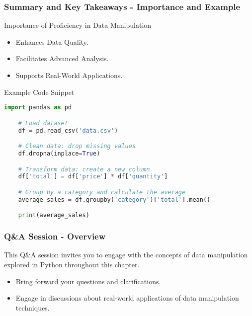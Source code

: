 \documentclass[aspectratio=169]{beamer}
\begin{document}
\begin{frame}[fragile]
    \frametitle{Summary and Key Takeaways - Importance and Example}
    \begin{block}{Importance of Proficiency in Data Manipulation}
        \begin{itemize}
            \item Enhances Data Quality.
            \item Facilitates Advanced Analysis.
            \item Supports Real-World Applications.
        \end{itemize}
    \end{block}

    \begin{block}{Example Code Snippet}
    \begin{lstlisting}[language=Python]
    import pandas as pd

    # Load dataset
    df = pd.read_csv('data.csv')

    # Clean data: drop missing values
    df.dropna(inplace=True)

    # Transform data: create a new column
    df['total'] = df['price'] * df['quantity']

    # Group by a category and calculate the average
    average_sales = df.groupby('category')['total'].mean()

    print(average_sales)
    \end{lstlisting}
    \end{block}
\end{frame}

\begin{frame}[fragile]
  \frametitle{Q\&A Session - Overview}
  This Q\&A session invites you to engage with the concepts of data manipulation explored in Python throughout this chapter. 
  \begin{itemize}
      \item Bring forward your questions and clarifications.
      \item Engage in discussions about real-world applications of data manipulation techniques.
  \end{itemize}
\end{frame}
\end{document}
